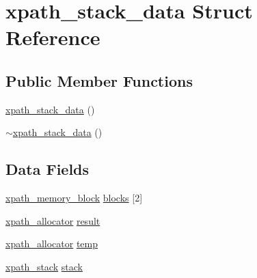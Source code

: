 \hypertarget{structxpath__stack__data}{
\section{xpath\_\-stack\_\-data Struct Reference}
\label{structxpath__stack__data}
}
\subsection*{Public Member Functions}
\begin{DoxyCompactItemize}
\item 
\hyperlink{structxpath__stack__data_aba4a588075a5ec45a3aa661b97d62ca6}{xpath\_\-stack\_\-data} ()
\item 
\hyperlink{structxpath__stack__data_a1df4e020ecc629b398336969c8490d98}{$\sim$xpath\_\-stack\_\-data} ()
\end{DoxyCompactItemize}
\subsection*{Data Fields}
\begin{DoxyCompactItemize}
\item 
\hyperlink{structxpath__memory__block}{xpath\_\-memory\_\-block} \hyperlink{structxpath__stack__data_a6821cc444dd65d997467fd3f757f4aff}{blocks} \mbox{[}2\mbox{]}
\item 
\hyperlink{classxpath__allocator}{xpath\_\-allocator} \hyperlink{structxpath__stack__data_ab073a685c66383ded44076993afe62d6}{result}
\item 
\hyperlink{classxpath__allocator}{xpath\_\-allocator} \hyperlink{structxpath__stack__data_a56e6bb486d52f4c5c2d02370e1b41058}{temp}
\item 
\hyperlink{structxpath__stack}{xpath\_\-stack} \hyperlink{structxpath__stack__data_ad26a92328f9aaf83fa62cb6695dbee90}{stack}
\end{DoxyCompactItemize}


